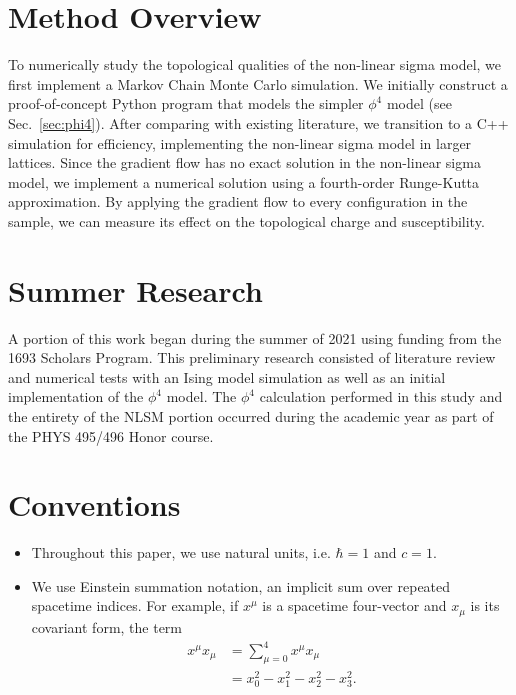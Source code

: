 \section{Method Overview}

To numerically study the topological qualities of the non-linear sigma model, we first implement a Markov Chain Monte Carlo simulation. We initially construct a proof-of-concept Python program that models the simpler $\phi^4$ model (see Sec.~\ref{sec:phi4}). After comparing with existing literature, we transition to a C++ simulation for efficiency, implementing the non-linear sigma model in larger lattices. Since the gradient flow has no exact solution in the non-linear sigma model, we implement a numerical solution using a fourth-order Runge-Kutta approximation. By applying the gradient flow to every configuration in the sample, we can measure its effect on the topological charge and susceptibility.

\section{Summer Research}

A portion of this work began during the summer of 2021 using funding from the 1693 Scholars Program. This preliminary research consisted of literature review and numerical tests with an Ising model simulation as well as an initial implementation of the $\phi^4$ model. The $\phi^4$ calculation performed in this study and the entirety of the NLSM portion occurred during the academic year as part of the PHYS 495/496 Honor course.


\section{Conventions}
\begin{itemize}
    \item Throughout this paper, we use natural units, i.e. $\hbar = 1$ and $c=1$.
    \item We use Einstein summation notation, an implicit sum over repeated spacetime indices. For example, if $x^\mu$ is a spacetime four-vector and $x_\mu$ is its covariant form, the term
        \begin{align*}
            x^\mu x_\mu &= \sum^4_{\mu=0} x^\mu x_\mu \\
            &= x_0^2-x_1^2-x_2^2-x_3^2.
        \end{align*}
\end{itemize}


